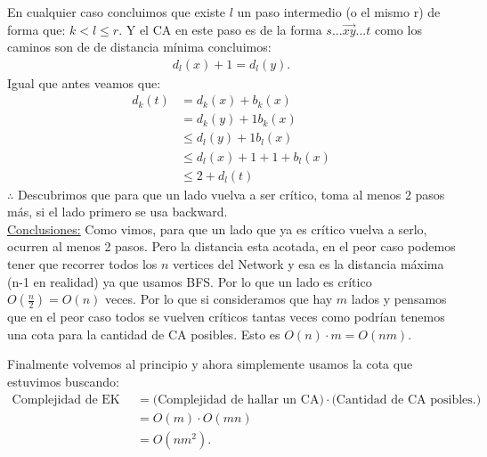 \documentclass{article}
\begin{document}
En cualquier caso concluimos que existe $l$ un paso intermedio (o el mismo r) de forma que:
$k < l \leq r$. Y el CA en este paso es de la forma $s...\overrightarrow{xy}...t$
como los caminos son de de distancia mínima concluimos:
\begin{equation}
	\begin{aligned}
		d_l(x) + 1 = d_l(y).
	\end{aligned}
\end{equation}
Igual que antes veamos que:
\begin{equation}
	\begin{aligned}
		d_k(t) &= d_k(x) + b_k(x)\\
		       &= d_k(y) + 1 b_k(x)\\
		       &\leq d_l(y) + 1 b_l(x)\\
		       &\leq d_l(x) + 1 + 1 + b_l(x)\\
		       &\leq 2 + d_l(t)


	\end{aligned}
\end{equation}
$\therefore$ Descubrimos que para que un lado vuelva a ser crítico, toma al menos 2 pasos más, 
si el lado primero se usa backward.\\

\underline{Conclusiones:} Como vimos, para que un lado que ya es crítico vuelva a serlo,
ocurren al menos 2 pasos. Pero la distancia esta acotada, en el peor caso podemos tener que
recorrer todos los $n$ vertices del Network y esa es la distancia máxima (n-1 en realidad)
ya que usamos BFS. Por lo que un lado es crítico $O(\frac{n}{2}) = O(n)$ veces.
Por lo que si consideramos que hay $m$ lados y pensamos que en el peor caso todos se vuelven 
críticos tantas veces como podrían tenemos una cota para la cantidad de CA posibles.
Esto es $O(n) \cdot m = O(nm) $.

Finalmente volvemos al principio y ahora simplemente usamos la cota que estuvimos buscando:
\begin{equation}
	\begin{aligned}
		\text{Complejidad de EK}\quad &= \text{(Complejidad de hallar un CA)} \cdot 
	\text{(Cantidad de CA posibles.)}\\
					&= O(m) \cdot O(mn) \\
					&= O(nm^2).
	\end{aligned}
\end{equation}
\end{document}
